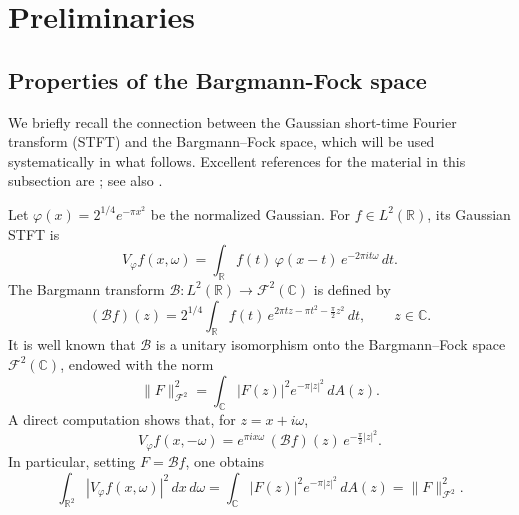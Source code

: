 \section{Preliminaries}

\subsection{Properties of the Bargmann-Fock space} We briefly recall the connection between the Gaussian short-time Fourier transform
(STFT) and the Bargmann--Fock space, which will be used systematically in what
follows. Excellent references for the material in this subsection are
\cite{Bargmann,Folland,Grochenig,Zhu}; see also
\cite{Berezin,Berger-Coburn,Daubechies}.

\medskip

Let $\varphi(x) = 2^{1/4} e^{-\pi x^2}$ be the normalized Gaussian. For $f \in L^2(\mathbb{R})$, its Gaussian STFT is
\begin{equation}\label{eq:STFT}
V_\varphi f(x,\omega)
= \int_{\mathbb{R}} f(t)\, \varphi(x-t)\, e^{-2\pi i t \omega}\, dt.
\end{equation}
The Bargmann transform
$\mathcal{B} : L^2(\mathbb{R}) \to \mathcal{F}^2(\mathbb{C})$ is defined by
\begin{equation}\label{eq:Bargmann}
(\mathcal{B}f)(z)
= 2^{1/4} \int_{\mathbb{R}} f(t)\, e^{2\pi t z - \pi t^2 - \frac{\pi}{2} z^2}\, dt,
\qquad z \in \mathbb{C}.
\end{equation}
It is well known that $\mathcal{B}$ is a unitary isomorphism onto the Bargmann--Fock
space $\mathcal{F}^2(\mathbb{C})$, endowed with the norm
\[
\|F\|_{\mathcal{F}^2}^2
= \int_{\mathbb{C}} |F(z)|^2 e^{-\pi |z|^2} \, dA(z).
\]
A direct computation shows that, for $z = x + i\omega$,
\begin{equation}\label{eq:STFT-B}
V_\varphi f(x,-\omega)
= e^{\pi i x \omega}\, (\mathcal{B}f)(z)\, e^{-\frac{\pi}{2}|z|^2}.
\end{equation}
In particular, setting $F = \mathcal{B}f$, one obtains
\begin{equation}\label{eq:energy}
\int_{\mathbb{R}^2} |V_\varphi f(x,\omega)|^2 \, dx\, d\omega
= \int_{\mathbb{C}} |F(z)|^2 e^{-\pi |z|^2} \, dA(z)
= \|F\|_{\mathcal{F}^2}^2.
\end{equation}

\medskip

\noindent
